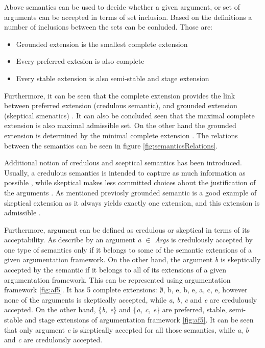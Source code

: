 Above semantics can be used to decide whether a given argument, or set of arguments can be accepted in terms of set inclusion.  Based on the definitions a number of inclusions between the sets can be conluded. Those are:
\begin{itemize}
	\item{Grounded extension is the smallest complete extension}
	\item{Every preferred extesion is also complete}
	\item{Every stable extension is also semi-stable and stage extension}
\end{itemize}
Furthermore, it can be seen that the complete extension provides the link between preferred extension (credulous semantic), and grounded extension (skeptical smenatics) \citep{dung1995}. It can also be concluded seen that the maximal complete extension is also maximal admissible set. On the other hand the grounded extension is determined by the minimal complete extension \citep{gaggl2009solving}. The relations between the semantics can be seen in figure \ref{fig:semanticsRelations}.


Additional notion of credulous and sceptical semantics has been introduced. Usually, a credulous semantics is intended to capture as much information as possible \citep{dix1995non}, while skeptical makes less committed choices about the justification of the arguments \citep{baroni2007comparing}. As mentioned previosly grounded semantic is a good example of skeptical extension as it always yields exactly one extension, and this extension is admissible \citep{caminada2007comparing}.

Furthermore, argument can be defined as credulous or skeptical in terms of its acceptability. As describe by \citet{arieli2015conflict} an argument \textit{a} $\in$ \textit{Args} is credulously accepted by one type of semantics only if it belongs to some of the semantic extensions of a given argumentation framework. On the other hand, the argument \textit{b} is skeptically accepted by the semantic if it belongs to all of its extensions of a given argumentation framework. This can be represented using argumentation framework \ref{fig:af5}. It has 5 complete extensions: $\emptyset$, {b}, {e}, {b, e}, {a, c, e}, however none of the arguments is skeptically accepted, while \textit{a}, \textit{b}, \textit{c} and \textit{e} are credulously accepted. On the other hand, \{\textit{b, e}\} and \{\textit{a, c, e}\} are preferred, stable, semi-stable and stage extensions of argumentation framework \ref{fig:af5}. It can be seen that only argument \textit{e} is skeptically accepted for all those semantics, while \textit{a}, \textit{b} and \textit{c} are credulously accepted.

